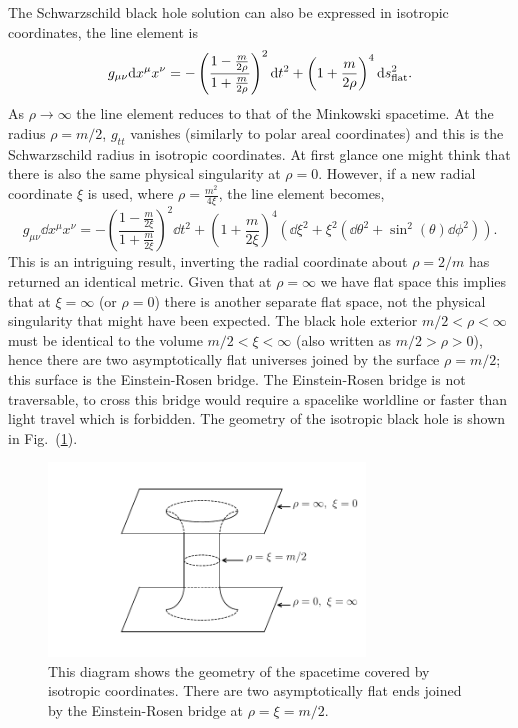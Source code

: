The Schwarzschild black hole solution can also be expressed in isotropic coordinates, the line element is
\\[-5pt]\begin{align} \label{intro:eq:iso_bh}
g_{\mu\nu} \dd x^\mu x^\nu = -\left(\frac{1-\frac{m}{2\rho}}{1+\frac{m}{2\rho}} \right)^2 \dd t^2 + \left(1+\frac{m}{2\rho} \right)^4 \dd s_{\rm flat}^2.
\end{align}
As $\rho \rightarrow \infty$ the line element reduces to that of the Minkowski spacetime. At the radius $\rho= m/2$, $g_{tt}$ vanishes (similarly to polar areal coordinates) and this is the Schwarzschild radius in isotropic coordinates. At first glance one might think that there is also the same physical singularity at $\rho=0$. However, if a new radial coordinate $\xi$ is used, where $\rho = \frac{m^2}{4\xi}$, the line element becomes,
\begin{equation}
g_{\mu\nu} \dd x^\mu x^\nu = -\left(\frac{1-\frac{m}{2\xi}}{1+\frac{m}{2\xi}} \right)^2 \dd t^2 + \left(1+\frac{m}{2\xi} \right)^4 \left(\dd \xi^2 + \xi^2(\dd \theta^2 + \sin^2 (\theta) \dd \phi^2) \right).
\end{equation}
This is an intriguing result, inverting the radial coordinate about $\rho=2/m$ has returned an identical metric. Given that at $\rho=\infty$ we have flat space this implies that at $\xi=\infty$ (or $\rho=0$) there is another separate flat space, not the physical singularity that might have been expected. The black hole exterior $m/2<\rho<\infty$ must be identical to the volume $m/2<\xi<\infty$ (also written as $m/2>\rho>0$), hence there are two asymptotically flat universes joined by the surface $\rho=m/2$; this surface is the Einstein-Rosen bridge. The Einstein-Rosen bridge is not traversable, to cross this bridge would require a spacelike worldline or faster than light travel which is forbidden. The geometry of the isotropic black hole is shown in Fig.~(\ref{intro:fig:scbh_er}).

\begin{figure}[h!]
\centering
    \includegraphics[width=0.75\textwidth]{png/tuuube.pdf}
    \caption{This diagram shows the geometry of the spacetime covered by isotropic coordinates. There are two asymptotically flat ends joined by the Einstein-Rosen bridge at $\rho=\xi=m/2$.}
    \label{intro:fig:scbh_er}
\end{figure}

